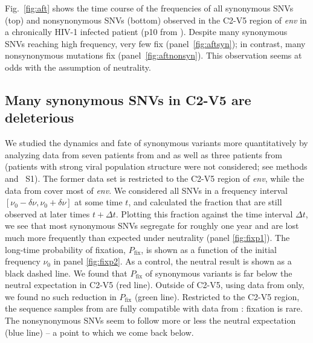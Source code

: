 \documentclass[11pt]{article}
\newcommand{\pfix}{P_{\mathrm{fix}}}
\newcommand{\FIG}[1]{Fig.~\ref{fig:#1}}
\newcommand{\env}{\textit{env}}
\newcommand{\shankaregion}{C2-V5}
\newcommand{\PCApat}{1}
\begin{document}
\FIG{aft} shows the time course of the frequencies of all synonymous
SNVs (top) and nonsynonymous SNVs (bottom) observed in the
\shankaregion{} region of \env{} in a chronically HIV-1 infected patient (p10 from
\citet{shankarappa_consistent_1999}). Despite many synonymous SNVs
reaching high frequency, very few fix (panel~\ref{fig:aftsyn}); in
contrast, many nonsynonymous mutations fix
(panel~\ref{fig:aftnonsyn}). This observation seems at odds with
the assumption of neutrality.

\subsection*{Many synonymous SNVs in \shankaregion{} are deleterious}
We studied the dynamics and fate of synonymous variants more quantitatively by
analyzing data from seven patients from \citet{shankarappa_consistent_1999} and
\citet{liu_selection_2006} as well as three patients from
\citet{bunnik_autologous_2008} (patients with strong viral population structure
were not considered; see methods and \figurename~S\PCApat). The
former data set is restricted to the \shankaregion{} region of \env, while the
data from \citet{bunnik_autologous_2008} cover most of \env.  We considered all
SNVs in a frequency interval $[\nu_0-\delta\nu, \nu_0+\delta\nu]$ at some time
$t$, and calculated the fraction that are still observed at later times $t+\Delta
t$. Plotting this fraction against the time interval $\Delta t$, we see that
most synonymous SNVs segregate for roughly one year and are lost much more
frequently than expected under neutrality (panel \ref{fig:fixp1}). The long-time
probability of fixation, $\pfix$, is shown as a function of the initial
frequency $\nu_0$ in panel \ref{fig:fixp2}. As a control, the neutral result is
shown as a black dashed line. We found that $\pfix$ of synonymous
variants is far below the neutral expectation in \shankaregion{} (red line).
Outside of \shankaregion, using data from \citet{bunnik_autologous_2008} only,
we found no such reduction in $\pfix$ (green line). Restricted to the
\shankaregion{} region, the sequence samples from \citet{bunnik_autologous_2008}
are fully compatible with data from \citet{shankarappa_consistent_1999}:
fixation is rare. The
nonsynonymous SNVs seem to follow more or less the neutral expectation (blue
line) -- a point to which we come back below.
\end{document}
